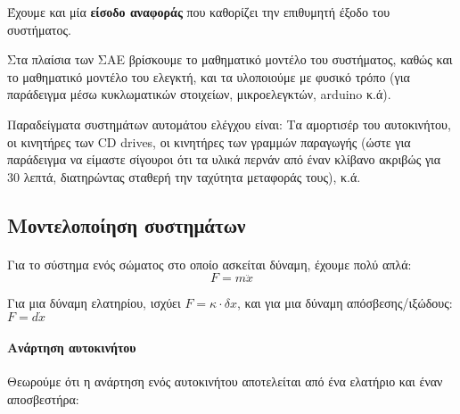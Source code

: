 \documentclass[11pt,a4paper,notitlepage,fleqn]{article}
\begin{document}
Έχουμε και μία \textbf{είσοδο αναφοράς} που καθορίζει την επιθυμητή έξοδο του συστήματος.

Στα πλαίσια των ΣΑΕ βρίσκουμε το μαθηματικό μοντέλο του συστήματος, καθώς και το μαθηματικό
μοντέλο του ελεγκτή, και τα υλοποιούμε με φυσικό τρόπο (για παράδειγμα μέσω κυκλωματικών
στοιχείων, μικροελεγκτών, arduino κ.ά).

Παραδείγματα συστημάτων αυτομάτου ελέγχου είναι: Τα αμορτισέρ του αυτοκινήτου, οι κινητήρες
των CD drives, οι κινητήρες των γραμμών παραγωγής (ώστε για παράδειγμα να είμαστε σίγουροι
ότι τα υλικά περνάν από έναν κλίβανο ακριβώς για 30 λεπτά, διατηρώντας σταθερή την
ταχύτητα μεταφοράς τους), κ.ά.

\subsection{Μοντελοποίηση συστημάτων}
\paragraph{}
Για το σύστημα ενός σώματος στο οποίο ασκείται δύναμη, έχουμε πολύ απλά:
\[
	F = m\ddot x
\]

Για μια δύναμη ελατηρίου, ισχύει \( F = \kappa \cdot \delta x \), και για μια δύναμη
απόσβεσης/ιξώδους: \( F = d\dot x \)

\paragraph{Ανάρτηση αυτοκινήτου}
Θεωρούμε ότι η ανάρτηση ενός αυτοκινήτου αποτελείται από ένα ελατήριο και έναν αποσβεστήρα:

\end{document}

